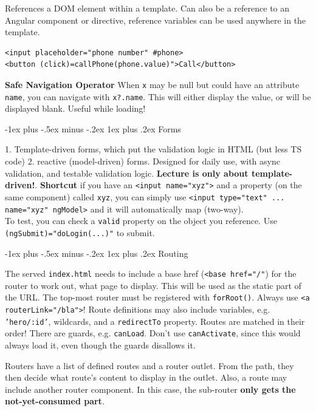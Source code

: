 \documentclass[a4paper, fontsize=6pt]{scrartcl}
\makeatletter
\renewcommand{\subsubsection}{\@startsection{subsubsection}{3}{0mm}%
    {-1ex plus -.5ex minus -.2ex}%
    {1ex plus .2ex}%
    {\normalfont\small\bfseries}}
\newcommand{\html}[1]{\texttt{#1}}
\newcommand{\js}[1]{\texttt{#1}}
\makeatother
\begin{document}
\begin{multicols*}{5}
References a DOM element within a template. Can also be a reference to an Angular component or directive, reference variables can be used anywhere in the template.

\begin{verbatim}
<input placeholder="phone number" #phone>
<button (click)=callPhone(phone.value)">Call</button>
\end{verbatim}

\textbf{Safe Navigation Operator} When \js{x} may be null but could have an attribute \js{name}, you can navigate with \js{x?.name}. This will either display the value, or will be displayed blank. Useful while loading!

\subsubsection{Forms}

1. Template-driven forms, which put the validation logic in HTML (but less TS code) 2. reactive (model-driven) forms. Designed for daily use, with async validation, and testable validation logic. \textbf{Lecture is only about template-driven!}. \textbf{Shortcut} if you have an \html{<input name="xyz">} and a property (on the same component) called \js{xyz}, you can simply use \html{<input type="text" ... name="xyz" ngModel>} and it will automatically map (two-way).\\To test, you can check a \js{valid} property on the object you reference. Use \html{(ngSubmit)="doLogin(...)"} to submit. 

\subsubsection{Routing}

The served \html{index.html} needs to include a base href (\html{<base href="/"}) for the router to work out, what page to display. This will be used as the static part of the URL. The top-most router must be registered with \js{forRoot()}. Always use \html{<a routerLink="/bla">}! Route definitions may also include variables, e.g. \js{'hero/:id'}, wildcards, and a \js{redirectTo} property. Routes are matched in their order! There are guards, e.g. \js{canLoad}. Don't use \js{canActivate}, since this would always load it, even though the guards disallows it.

Routers have a list of defined routes and a router outlet. From the path, they then decide what route's content to display in the outlet. Also, a route may include another router component. In this case, the sub-router \textbf{only gets the not-yet-consumed part}. 


\end{multicols*}
\end{document}
